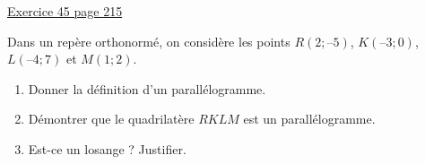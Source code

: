 \documentclass{automatisme}
\begin{document}
\begin{frame}
	{\Large\uline{Exercice 45 page 215}}

	Dans un repère orthonormé, on considère les points $R(2 ; –5)$, $K(–3 ; 0)$, $L(–4 ; 7)$ et $M(1 ; 2)$.
	\begin{enumerate}
		\item Donner la définition d'un parallélogramme.
		\item Démontrer que le quadrilatère $RKLM$ est un parallélogramme.
		\item Est-ce un losange ? Justifier.
	\end{enumerate}
\end{frame}
\end{document}
